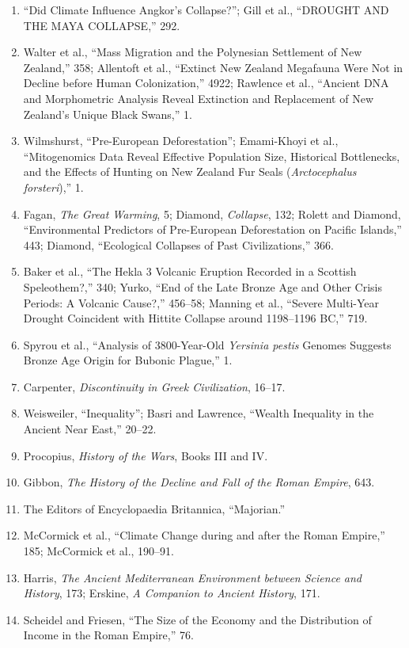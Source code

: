 \documentclass[12pt]{article}
\begin{document}
\begin{enumerate}[leftmargin=*]
\item ``Did Climate Influence Angkor’s Collapse?''; Gill et al., ``DROUGHT AND THE MAYA COLLAPSE,'' 292.
\item Walter et al., ``Mass Migration and the Polynesian Settlement of New Zealand,'' 358; Allentoft et al., ``Extinct New Zealand Megafauna Were Not in Decline before Human Colonization,'' 4922; Rawlence et al., ``Ancient DNA and Morphometric Analysis Reveal Extinction and Replacement of New Zealand’s Unique Black Swans,'' 1.
\item Wilmshurst, ``Pre-European Deforestation''; Emami-Khoyi et al., ``Mitogenomics Data Reveal Effective Population Size, Historical Bottlenecks, and the Effects of Hunting on New Zealand Fur Seals (\textit{Arctocephalus forsteri}),'' 1.
\item Fagan, \textit{The Great Warming}, 5; Diamond, \textit{Collapse}, 132; Rolett and Diamond, ``Environmental Predictors of Pre-European Deforestation on Pacific Islands,'' 443; Diamond, ``Ecological Collapses of Past Civilizations,'' 366.
\item Baker et al., ``The Hekla 3 Volcanic Eruption Recorded in a Scottish Speleothem?,'' 340; Yurko, ``End of the Late Bronze Age and Other Crisis Periods: A Volcanic Cause?,'' 456--58; Manning et al., ``Severe Multi-Year Drought Coincident with Hittite Collapse around 1198--1196 BC,'' 719.
\item Spyrou et al., ``Analysis of 3800-Year-Old \textit{Yersinia pestis} Genomes Suggests Bronze Age Origin for Bubonic Plague,'' 1.
\item Carpenter, \textit{Discontinuity in Greek Civilization}, 16--17.
\item Weisweiler, ``Inequality''; Basri and Lawrence, ``Wealth Inequality in the Ancient Near East,'' 20--22.
\item Procopius, \textit{History of the Wars}, Books III and IV.
\item Gibbon, \textit{The History of the Decline and Fall of the Roman Empire}, 643.
\item The Editors of Encyclopaedia Britannica, ``Majorian.''
\item McCormick et al., ``Climate Change during and after the Roman Empire,'' 185; McCormick et al., 190--91.
\item Harris, \textit{The Ancient Mediterranean Environment between Science and History}, 173; Erskine, \textit{A Companion to Ancient History}, 171.
\item Scheidel and Friesen, ``The Size of the Economy and the Distribution of Income in the Roman Empire,'' 76.

\end{enumerate}
\end{document}
